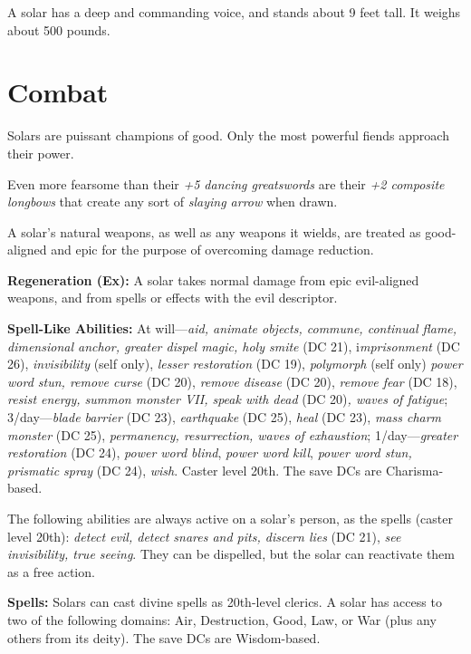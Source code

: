 \documentclass{article}
\begin{document}
A solar has a deep and commanding voice, and stands about 9 feet tall. It weighs 
about 500 pounds.

\section*{\textbf{Combat}}

Solars are puissant champions of good. Only the most powerful fiends approach their 
power.

Even more fearsome than their \textit{+5 dancing greatswords }are their \textit{+2 
composite longbows }that create any sort of \textit{slaying arrow }when drawn.

A solar's natural weapons, as well as any weapons it wields, are treated as good-aligned 
and epic for the purpose of overcoming damage reduction.

\textbf{Regeneration (Ex):} A solar takes normal damage from epic evil-aligned 
weapons, and from spells or effects with the evil descriptor.

\textbf{Spell-Like Abilities:} At will---\textit{aid, animate objects, commune, 
continual flame, dimensional anchor, greater dispel magic, holy smite }(DC 21), 
i\textit{mprisonment }(DC 26), \textit{invisibility }(self only), \textit{lesser 
restoration }(DC 19), \textit{polymorph }(self only) \textit{power word stun, remove 
curse }(DC 20), \textit{remove disease }(DC 20), \textit{remove fear }(DC 18), 
\textit{resist energy, summon monster VII, speak with dead }(DC 20)\textit{, waves 
of fatigue}; 3/day---\textit{blade barrier }(DC 23), \textit{earthquake }(DC 25), 
\textit{heal }(DC 23), \textit{mass charm monster }(DC 25), \textit{permanency, 
resurrection, waves of exhaustion}; 1/day---\textit{greater restoration }(DC 24), 
\textit{power word blind}, \textit{power word kill}, \textit{power word stun, prismatic 
spray }(DC 24), \textit{wish}. Caster level 20th. The save DCs are Charisma-based.

The following abilities are always active on a solar's person, as the spells (caster 
level 20th): \textit{detect evil, detect snares and pits, discern lies }(DC 21), 
\textit{see invisibility, true seeing}. They can be dispelled, but the solar can 
reactivate them as a free action.

\textbf{Spells:} Solars can cast divine spells as 20th-level clerics. A solar has 
access to two of the following domains: Air, Destruction, Good, Law, or War (plus 
any others from its deity). The save DCs are Wisdom-based.
\end{document}
